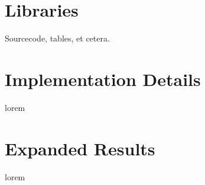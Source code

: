 \chapter{Libraries}

Sourcecode, tables, et cetera.



\chapter{Implementation Details}

lorem



\chapter{Expanded Results}

lorem



